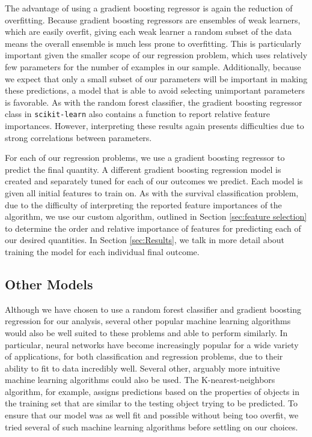 \documentclass[fleqn,usenatbib]{mnras}
\begin{document}
The advantage of using a gradient boosting regressor is again the reduction of overfitting. Because gradient boosting regressors are ensembles of weak learners, which are easily overfit, giving each weak learner a random subset of the data means the overall ensemble is much less prone to overfitting. This is particularly important given the smaller scope of our regression problem, which uses relatively few parameters for the number of examples in our sample. Additionally, because we expect that only a small subset of our parameters will be important in making these predictions, a model that is able to avoid selecting unimportant parameters is favorable. As with the random forest classifier, the gradient boosting regressor class in \texttt{scikit-learn} also contains a function to report relative feature importances. However, interpreting these results again presents difficulties due to strong correlations between parameters.

For each of our regression problems, we use a gradient boosting regressor to predict the final quantity. A different gradient boosting regression model is created and separately tuned for each of our outcomes we predict. Each model is given all initial features to train on. As with the survival classification problem, due to the difficulty of interpreting the reported feature importances of the algorithm, we use our custom algorithm, outlined in Section \ref{sec:feature selection} to determine the order and relative importance of features for predicting each of our desired quantities. In Section \ref{sec:Results}, we talk in more detail about training the model for each individual final outcome.

\subsection{Other Models}
\label{sec:other models} %
Although we have chosen to use a random forest classifier and gradient boosting regression for our analysis, several other popular machine learning algorithms would also be well suited to these problems and able to perform similarly. In particular, neural networks have become increasingly popular for a wide variety of applications, for both classification and regression problems, due to their ability to fit to data incredibly well. Several other, arguably more intuitive machine learning algorithms could also be used. The K-nearest-neighbors algorithm, for example, assigns predictions based on the properties of objects in the training set that are similar to the testing object trying to be predicted. To ensure that our model was as well fit and possible without being too overfit, we tried several of such machine learning algorithms before settling on our choices.
\end{document}
